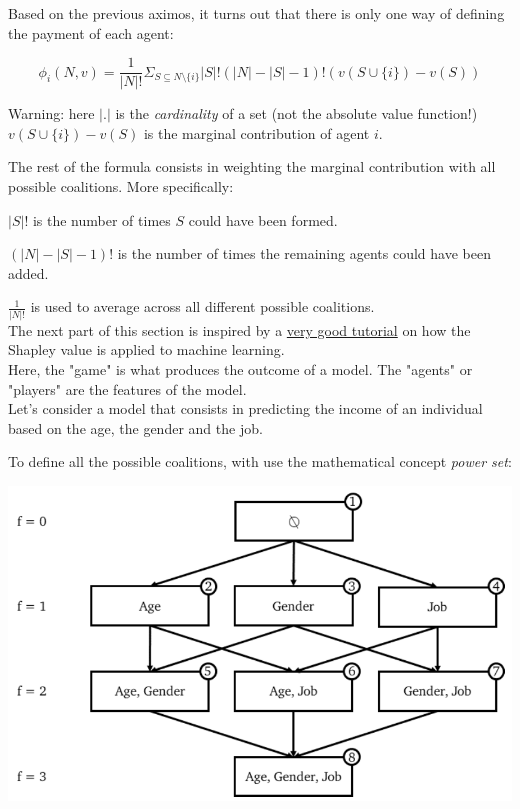 Based on the previous aximos, it turns out that there is only one way of defining the payment of each agent:

$$\phi_i(N, v) = \frac{1}{|N|!} \Sigma_{S \subseteq N\setminus \{i\}} |S|! (|N| - |S| - 1)! (v({S \cup \{i\}}) - v(S))$$

Warning: here $|.|$ is the \textit{cardinality} of a set (not the absolute value function!) \\

$v({S \cup \{i\}}) - v(S)$ is the marginal contribution of agent $i$.

The rest of the formula consists in weighting the marginal contribution with all possible coalitions. More specifically:

$|S|!$ is the number of times $S$ could have been formed.

$(|N| - |S| - 1)!$ is the number of times the remaining agents could have been added.

$\frac{1}{|N|!}$ is used to average across all different possible coalitions. \\

The next part of this section is inspired by a \href{https://towardsdatascience.com/shap-explained-the-way-i-wish-someone-explained-it-to-me-ab81cc69ef30?}{very good tutorial} on how the Shapley value is applied to machine learning. \\

Here, the "game" is what produces the outcome of a model. The "agents" or "players" are the features of the model. \\

Let's consider a model that consists in predicting the income of an individual based on the age, the gender and the job.

To define all the possible coalitions, with use the mathematical concept \textit{power set}:

\begin{center}
\includegraphics[scale=0.35]{powerset_1.png}
\end{center}

